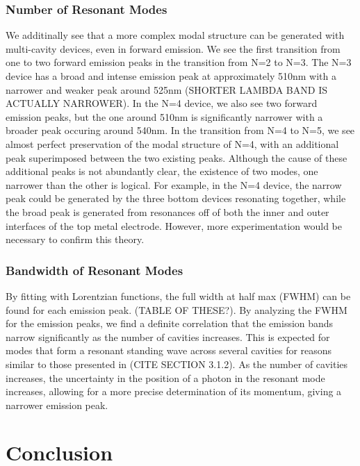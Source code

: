\documentclass{report}
\begin{document}
        \subsection{Number of Resonant Modes}
        We additinally see that a more complex modal structure can be generated with multi-cavity devices, even in forward emission. We see the first transition from one to two forward emission peaks in the transition from N=2 to N=3. The N=3 device has a broad and intense emission peak at approximately 510nm with a narrower and weaker peak around 525nm (SHORTER LAMBDA BAND IS ACTUALLY NARROWER). In the N=4 device, we also see two forward emission peaks, but the one around 510nm is significantly narrower with a broader peak occuring around 540nm. In the transition from N=4 to N=5, we see almost perfect preservation of the modal structure of N=4, with an additional peak superimposed between the two existing peaks. Although the cause of these additional peaks is not abundantly clear, the existence of two modes, one narrower than the other is logical. For example, in the N=4 device, the narrow peak could be generated by the three bottom devices resonating together, while the broad peak is generated from resonances off of both the inner and outer interfaces of the top metal electrode. However, more experimentation would be necessary to confirm this theory.
        
        \subsection{Bandwidth of Resonant Modes}
        By fitting with Lorentzian functions, the full width at half max (FWHM) can be found for each emission peak. (TABLE OF THESE?). By analyzing the FWHM for the emission peaks, we find a definite correlation that the emission bands narrow significantly as the number of cavities increases. This is expected for modes that form a resonant standing wave across several cavities for reasons similar to those presented in (CITE SECTION 3.1.2). As the number of cavities increases, the uncertainty in the position of a photon in the resonant mode increases, allowing for a more precise determination of its momentum, giving a narrower emission peak.

\chapter{Conclusion}
\end{document}
